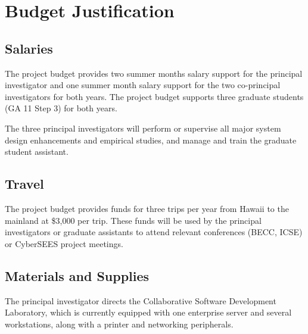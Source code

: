 

\section*{Budget Justification}


\subsection*{Salaries}

The project budget provides two summer months salary support for the principal investigator
and one summer month salary support for the two co-principal investigators for both years. 
The project budget supports three graduate students (GA 11 Step 3) for both years. 

The three principal investigators will perform or supervise all major system design enhancements and empirical studies, and manage and train the graduate student assistant.

\subsection*{Travel}

The project budget provides funds for three trips per year from Hawaii to the
mainland at \$3,000 per trip.  These funds will be used by the principal investigators or
graduate assistants to attend relevant conferences (BECC, ICSE) or CyberSEES project meetings.

\subsection*{Materials and Supplies}

The principal investigator directs the Collaborative Software Development
Laboratory, which is currently equipped with one enterprise server and several
workstations, along with a printer and networking peripherals.  

